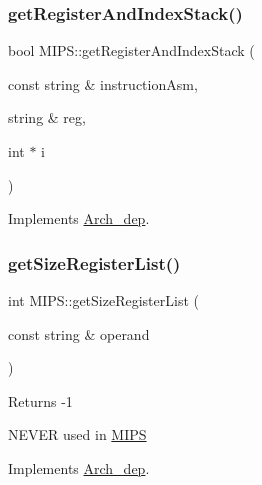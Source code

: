 \subsubsection{\texorpdfstring{get\+Register\+And\+Index\+Stack()}{getRegisterAndIndexStack()}}
{\footnotesize\ttfamily bool M\+I\+P\+S\+::get\+Register\+And\+Index\+Stack (\begin{DoxyParamCaption}\item[{const string \&}]{instruction\+Asm,  }\item[{string \&}]{reg,  }\item[{int $\ast$}]{i }\end{DoxyParamCaption})\hspace{0.3cm}{\ttfamily [virtual]}}



Implements \hyperlink{classArch__dep_a449f2174ec019b4526e1904716d7bae1}{Arch\+\_\+dep}.

\mbox{\label{classMIPS_a475db73349cc940f47e5e0c310ac8912}} 
\subsubsection{\texorpdfstring{get\+Size\+Register\+List()}{getSizeRegisterList()}}
{\footnotesize\ttfamily int M\+I\+P\+S\+::get\+Size\+Register\+List (\begin{DoxyParamCaption}\item[{const string \&}]{operand }\end{DoxyParamCaption})\hspace{0.3cm}{\ttfamily [virtual]}}

Returns -\/1

N\+E\+V\+ER used in \hyperlink{classMIPS}{M\+I\+PS} 

Implements \hyperlink{classArch__dep_aff5899fb3e5793bf07f43512bfcc04e1}{Arch\+\_\+dep}.

\mbox{\label{classMIPS_a1e122412b5edefe1b92b2b4851255a69}} 
